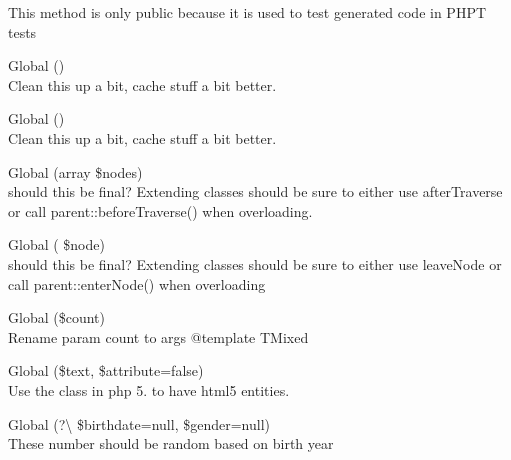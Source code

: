 \begin{DoxyRefList}
This method is only public because it is used to test generated code in PHPT tests 
\item[Global \doxylink{class_whoops_1_1_exception_1_1_inspector_acf0fa98548c6a73a611c1955b3f9fd94}{Inspector\+::get\+Previous\+Exception\+Inspector} ()]\hfill \\
\label{todo__todo000010}%
%
Clean this up a bit, cache stuff a bit better.  
\item[Global \doxylink{interface_whoops_1_1_inspector_1_1_inspector_interface_acf0fa98548c6a73a611c1955b3f9fd94}{Inspector\+Interface\+::get\+Previous\+Exception\+Inspector} ()]\hfill \\
\label{todo__todo000011}%
%
Clean this up a bit, cache stuff a bit better.  
\item[Global \doxylink{class_psy_1_1_code_cleaner_1_1_namespace_aware_pass_a61cf9be18190b38cbe8e0778f4cb2fd8}{Namespace\+Aware\+Pass\+::before\+Traverse} (array \$nodes)]\hfill \\
\label{todo__todo000025}%
%
should this be final? Extending classes should be sure to either use after\+Traverse or call parent\+::before\+Traverse() when overloading. 
\item[Global \doxylink{class_psy_1_1_code_cleaner_1_1_namespace_aware_pass_a72d9ab2b97095f3bf1c97eb453a386d1}{Namespace\+Aware\+Pass\+::enter\+Node} (\doxylink{namespace_php_parser_1_1_node}{Node} \$node)]\hfill \\
\label{todo__todo000026}%
%
should this be final? Extending classes should be sure to either use leave\+Node or call parent\+::enter\+Node() when overloading 
\item[Global \doxylink{class_mockery_1_1_exception_1_1_no_matching_expectation_exception_a86d5a83f8eef88f4eacf3a4202a7f1f7}{No\+Matching\+Expectation\+Exception\+::set\+Actual\+Arguments} (\$count)]\hfill \\
\label{todo__todo000022}%
%
Rename param {\ttfamily count} to {\ttfamily args} @template TMixed 
\item[Global \doxylink{class_masterminds_1_1_h_t_m_l5_1_1_serializer_1_1_output_rules_abae6c1553d39ac9e622734e7bbb17d05}{Output\+Rules\+::enc} (\$text, \$attribute=false)]\hfill \\
\label{todo__todo000021}%
%
Use the  class in php 5. to have html5 entities. 
\item[Global \doxylink{class_faker_1_1_provider_1_1nb___n_o_1_1_person_a0bf44cac62131ed3989cf188cbf2e0d9}{Person\+::personal\+Identity\+Number} (?\textbackslash{}\doxylink{class_faker_1_1_provider_1_1_date_time}{Date\+Time} \$birthdate=null, \$gender=null)]\hfill \\
\label{todo__todo000007}%
%
These number should be random based on birth year


\end{DoxyRefList}
